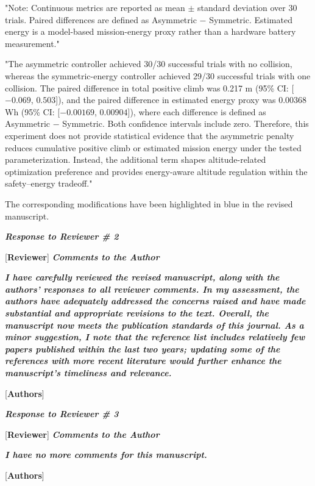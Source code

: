 \documentclass[12pt, twosides]{article}
\theoremstyle{definition}
\begin{document}
"Note: Continuous metrics are reported as mean $\pm$ standard deviation over 30 trials. Paired differences are defined as Asymmetric $-$ Symmetric. Estimated energy is a model-based mission-energy proxy rather than a hardware battery measurement."

"The asymmetric controller achieved 30/30 successful trials with no collision, whereas the symmetric-energy controller achieved 29/30 successful trials with one collision. The paired difference in total positive climb was 0.217 m (95\% CI: [$-0.069$, $0.503$]), and the paired difference in estimated energy proxy was 0.00368 Wh (95\% CI: [$-0.00169$, $0.00904$]), where each difference is defined as Asymmetric $-$ Symmetric. Both confidence intervals include zero. Therefore, this experiment does not provide statistical evidence that the asymmetric penalty reduces cumulative positive climb or estimated mission energy under the tested parameterization. Instead, the additional term shapes altitude-related optimization preference and provides energy-aware altitude regulation within the safety--energy tradeoff."

The corresponding modifications have been highlighted in blue in the revised manuscript.

\begin{center}
\textbf{\textit{\large Response to Reviewer \# 2}}
\end{center}

\textcolor[rgb]{0.00,0.00,1.00}{[\textbf {Reviewer}]} \textit{\textbf{Comments to the Author}}

\textit{\textbf{I have carefully reviewed the revised manuscript, along with the authors' responses to all reviewer comments. In my assessment, the authors have adequately addressed the concerns raised and have made substantial and appropriate revisions to the text. Overall, the manuscript now meets the publication standards of this journal. As a minor suggestion, I note that the reference list includes relatively few papers published within the last two years; updating some of the references with more recent literature would further enhance the manuscript's timeliness and relevance.}}

\textcolor[rgb]{0.00,0.00,1.00}{[\textbf{Authors}]}

\begin{center}
\textbf{\textit{\large Response to Reviewer \# 3}}
\end{center}

\textcolor[rgb]{0.00,0.00,1.00}{[\textbf {Reviewer}]} \textit{\textbf{Comments to the Author}}

\textit{\textbf{I have no more comments for this manuscript.}}

\textcolor[rgb]{0.00,0.00,1.00}{[\textbf{Authors}]}
\end{document}
